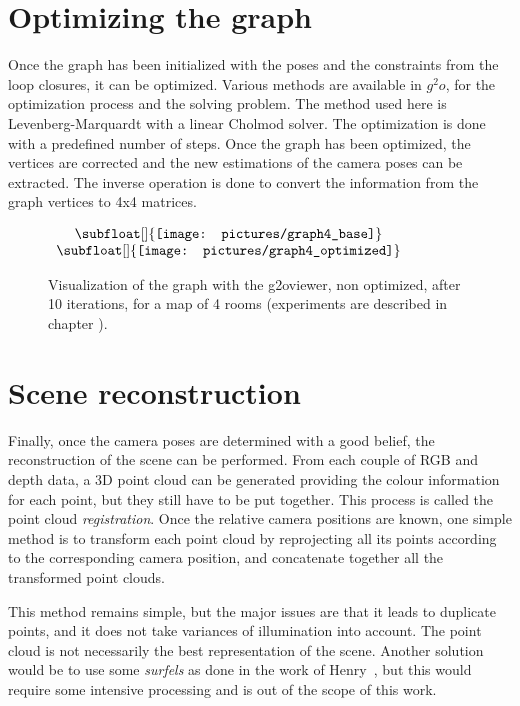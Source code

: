 \section{Optimizing the graph}

Once the graph has been initialized with the poses and the constraints from the loop closures, it can be optimized. Various methods are available in $g^2o$, for the optimization process and the solving problem. The method used here is Levenberg-Marquardt with a linear Cholmod solver. The optimization is done with a predefined number of steps. Once the graph has been optimized, the vertices are corrected and the new estimations of the camera poses can be extracted. The inverse operation is done to convert the information from the graph vertices to 4x4 matrices.

\begin{figure}[H]
\centering$
 \begin{array}{c}
 \subfloat[]{\label{fig:g2o_view_1}\texttt{[image: pictures/graph4\_base]}} \\
 \subfloat[]{\label{fig:g2o_view_2}\texttt{[image: pictures/graph4\_optimized]}}
 \end{array}$
\caption{Visualization of the graph with the g2oviewer,  non optimized,  after 10 iterations, for a map of 4 rooms (experiments are described in chapter \protect{\ref{chap:experiments}}).}
\end{figure}
\clearpage

\section{Scene reconstruction}

Finally, once the camera poses are determined with a good belief, the reconstruction of the scene can be performed. From each couple of RGB and depth data, a 3D point cloud can be generated providing the colour information for each point, but they still have to be put together. This process is called the point cloud \emph{registration}. Once the relative camera positions are known, one simple method is to transform each point cloud by reprojecting all its points according to the corresponding camera position, and concatenate together all the transformed point clouds.

This method remains simple, but the major issues are that it leads to duplicate points, and it does not take variances of illumination into account. The point cloud is not necessarily the best representation of the scene. Another solution would be to use some \emph{surfels} as done in the work of Henry~\cite{Henry_RGBD_2010}, but this would require some intensive processing and is out of the scope of this work.

